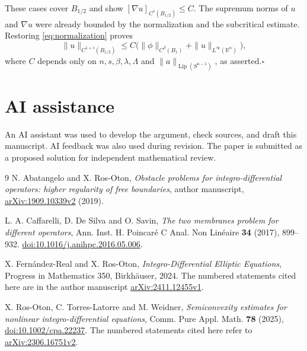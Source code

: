 \documentclass[11pt]{article}
\numberwithin{equation}{section}
\newcommand{\R}{\mathbb R}
\newcommand{\Sn}{S^{n-1}}
\newcommand{\Lip}{\operatorname{Lip}}
\begin{document}
These cases cover $B_{1/2}$ and show $[\nabla u]_{C^s(B_{1/2})}\leq C$.
The supremum norms of $u$ and $\nabla u$ were already bounded by the
normalization and the subcritical estimate. Restoring
\eqref{eq:normalization} proves
\[
 \|u\|_{C^{1+s}(B_{1/2})}
       \leq C\bigl(\|\phi\|_{C^\beta(B_1)}+\|u\|_{L^\infty(\R^n)}\bigr),
\]
where $C$ depends only on $n,s,\beta,\lambda,\Lambda$ and
$\|a\|_{\Lip(\Sn)}$, as asserted.\hfill$\square$

\section*{AI assistance}
An AI assistant was used to develop the argument, check sources, and draft
this manuscript. AI feedback was also used during revision.
The paper is submitted as a proposed solution for independent
mathematical review.

\begin{thebibliography}{9}
N. Abatangelo and X. Ros-Oton,
\emph{Obstacle problems for integro-differential operators: higher regularity
of free boundaries}, author manuscript,
\href{https://arxiv.org/abs/1909.10339v2}{arXiv:1909.10339v2} (2019).

L. A. Caffarelli, D. De Silva and O. Savin,
\emph{The two membranes problem for different operators},
Ann. Inst. H. Poincar\'e C Anal. Non Lin\'eaire \textbf{34} (2017), 899--932.
\href{https://doi.org/10.1016/j.anihpc.2016.05.006}{doi:10.1016/j.anihpc.2016.05.006}.

X. Fern\'andez-Real and X. Ros-Oton,
\emph{Integro-Differential Elliptic Equations}, Progress in Mathematics 350,
Birkh\"auser, 2024.
The numbered statements cited here are in the author manuscript
\href{https://arxiv.org/abs/2411.12455v1}{arXiv:2411.12455v1}.

X. Ros-Oton, C. Torres-Latorre and M. Weidner,
\emph{Semiconvexity estimates for nonlinear integro-differential equations},
Comm. Pure Appl. Math. \textbf{78} (2025),
\href{https://doi.org/10.1002/cpa.22237}{doi:10.1002/cpa.22237}.
The numbered statements cited here refer to
\href{https://arxiv.org/abs/2306.16751v2}{arXiv:2306.16751v2}.
\end{thebibliography}
\end{document}
